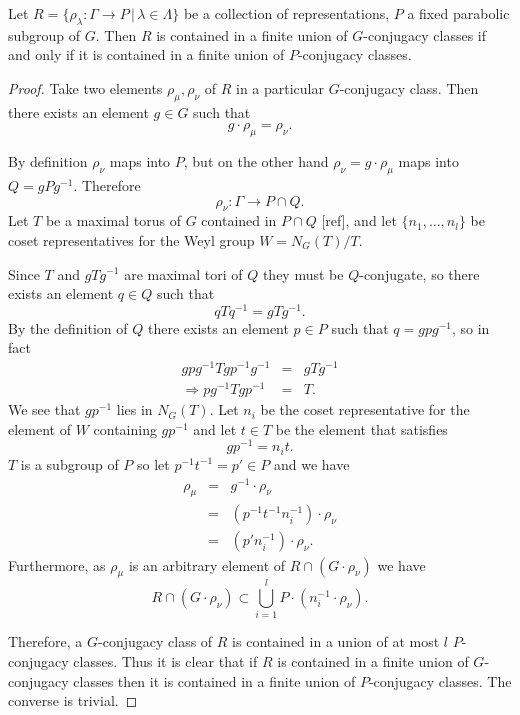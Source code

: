 \begin{lemma}\label{GIsPConj} Let $R=\{\rho_\lambda:\Gamma\rightarrow P\, |\, \lambda \in \Lambda\}$ be a collection of representations, $P$ a fixed parabolic subgroup of $G$. Then $R$ is contained in a finite union of $G$-conjugacy classes if and only if it is contained in a finite union of $P$-conjugacy classes.
\end{lemma}
\begin{proof}
	Take two elements $\rho_\mu, \rho_\nu$ of $R$ in a particular $G$-conjugacy class. Then there exists an element $g\in G$ such that
	\begin{displaymath}
		g\cdot \rho_\mu = \rho_\nu.
	\end{displaymath}
	
	By definition $\rho_\nu$ maps into $P$, but on the other hand $\rho_\nu = g\cdot \rho_\mu$ maps into $Q = gPg^{-1}$. Therefore 
	\begin{displaymath}
		\rho_\nu: \Gamma\rightarrow P \cap Q.
	\end{displaymath}
	Let $T$ be a maximal torus of $G$ contained in $P\cap Q$ [ref], and let $\{n_1, \ldots, n_l\}$ be coset representatives for the Weyl group $W = N_G(T)/T$.
	
	Since $T$ and $gTg^{-1}$ are maximal tori of $Q$ they must be $Q$-conjugate, so there exists an element $q\in Q$ such that
	\begin{displaymath}
		qTq^{-1} = gTg^{-1}.
	\end{displaymath}
	By the definition of $Q$ there exists an element $p\in P$ such that $q = gpg^{-1}$, so in fact
	\begin{eqnarray*}
		gpg^{-1}Tgp^{-1}g^{-1} &=& gTg^{-1} \\
		\Rightarrow pg^{-1}Tgp^{-1} &=& T.
	\end{eqnarray*}
	We see that $gp^{-1}$ lies in $N_G(T)$. Let $n_i$ be the coset representative for the element of $W$ containing $gp^{-1}$ and let $t\in T$ be the element that satisfies
	\begin{displaymath}
		gp^{-1} = n_it.
	\end{displaymath}
	$T$ is a subgroup of $P$ so let $p^{-1}t^{-1} = p' \in P$ and we have
	\begin{eqnarray*}
		\rho_\mu &=& g^{-1}\cdot\rho_\nu\\
		&=& (p^{-1}t^{-1}n_i^{-1})\cdot\rho_\nu\\
		&=& (p'n_i^{-1})\cdot\rho_\nu. 
	\end{eqnarray*}
	Furthermore, as $\rho_\mu$ is an arbitrary element of $R\cap \left(G\cdot \rho_\nu\right)$ we have
	\begin{displaymath}
		R \cap \left(G\cdot \rho_\nu\right) \subset \bigcup_{i=1}^l P\cdot(n_i^{-1}\cdot\rho_\nu).
	\end{displaymath}
	
	Therefore, a $G$-conjugacy class of $R$ is contained in a union of at most $l$ $P$-conjugacy classes. Thus it is clear that if $R$ is contained in a finite union of $G$-conjugacy classes then it is contained in a finite union of $P$-conjugacy classes. The converse is trivial.
\end{proof}

